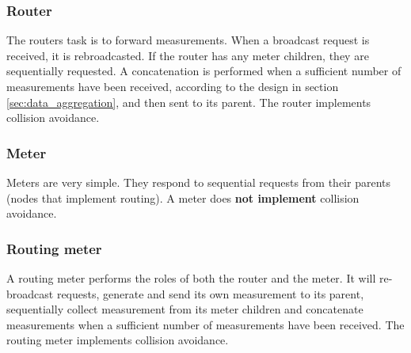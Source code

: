  
\subsubsection{Router}

The routers task is to forward measurements. When a broadcast request is received, it is rebroadcasted. If the router has any meter children, they are sequentially requested. A concatenation is performed when a sufficient number of measurements have been received, according to the design in section \ref{sec:data_aggregation}, and then sent to its parent. The router implements collision avoidance.


\subsubsection{Meter}

Meters are very simple. They respond to sequential requests from their parents (nodes that implement routing). A meter does \textbf{not implement} collision avoidance.


\subsubsection{Routing meter}

A routing meter performs the roles of both the router and the meter. It will re-broadcast requests, generate and send its own measurement to its parent, sequentially collect measurement from its meter children and concatenate measurements when a sufficient number of measurements have been received. The routing meter implements collision avoidance.
